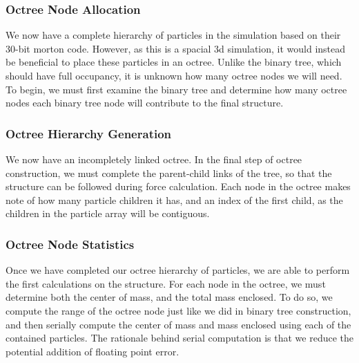 \documentclass{thesis}
\begin{document}
\subsubsection{Octree Node Allocation}
We now have a complete hierarchy of particles in the simulation based on their 30-bit morton code. However, as this is a spacial 3d simulation, it would instead be beneficial to place these particles in an octree. Unlike the binary tree, which should have full occupancy, it is unknown how many octree nodes we will need. To begin, we must first examine the binary tree and determine how many octree nodes each binary tree node will contribute to the final structure. 
\subsubsection{Octree Hierarchy Generation}
We now have an incompletely linked octree. In the final step of octree construction, we must complete the parent-child links of the tree, so that the structure can be followed during force calculation. Each node in the octree makes note of how many particle children it has, and an index of the first child, as the children in the particle array will be contiguous. 
\subsubsection{Octree Node Statistics}
Once we have completed our octree hierarchy of particles, we are able to perform the first calculations on the structure. For each node in the octree, we must determine both the center of mass, and the total mass enclosed. To do so, we compute the range of the octree node just like we did in binary tree construction, and then serially compute the center of mass and mass enclosed using each of the contained particles. The rationale behind serial computation is that we reduce the potential addition of floating point error.
\end{document}
